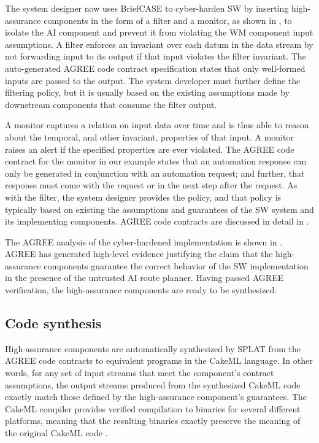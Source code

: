 The system designer now uses BriefCASE to cyber-harden SW by inserting
high-assurance components in the form of a filter and a monitor, as
shown in , to isolate the AI component and prevent it from violating the WM component input assumptions.
A filter enforces an invariant over
each datum in the data stream by not forwarding input to its output if
that input violates the filter invariant.  The auto-generated AGREE
code contract specification states that only well-formed inputs are passed to the
output.  The system developer must further define the filtering
policy, but it is usually based on the existing assumptions made by
downstream components that consume the filter output.

A monitor captures a relation on input data over time and is thus able
to reason about the temporal, and other invariant, properties of that input.  A monitor raises
an alert if the specified properties are ever violated.  The
AGREE code contract for the monitor in our example states that an
automation response can only be generated in conjunction with an
automation request; and further, that response must come with the
request or in the next step after the request.  As with the filter,
the system designer provides the policy, and that policy is typically
based on existing the assumptions and guarantees of the SW system and its implementing components.
AGREE code contracts are discussed in detail in .

The AGREE analysis of the cyber-hardened implementation is shown in
. AGREE has generated high-level
evidence justifying the claim that the high-assurance components
guarantee the correct behavior of the SW implementation in the
presence of the untrusted AI route planner.  Having passed AGREE
verification, the high-assurance components are ready to be
synthesized.

\subsection{Code synthesis}
High-assurance components are automatically synthesized by SPLAT from
the AGREE code contracts to equivalent programs in the CakeML
language.
 In other words, for any set of input streams that meet the
 component's contract assumptions, the output streams produced from
 the synthesized CakeML code exactly match those defined by the
 high-assurance component's guarantees.  The CakeML compiler provides
 verified compilation to binaries for several different platforms,
 meaning that the resulting binaries exactly preserve the meaning of
 the original CakeML code \cite{cakeml}.


